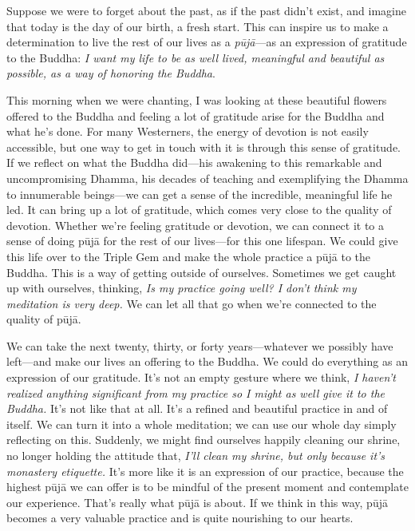 Suppose we were to forget about the past, as if the past didn't exist, 
and imagine that today is the day of our birth, a fresh start. This can 
inspire us to make a determination to live the rest of our lives as a 
\emph{pūjā}---as an expression of gratitude to the Buddha: \emph{I 
want my life to be as well lived, meaningful and beautiful as possible, 
as a way of honoring the Buddha}.

This morning when we were chanting, I was looking at these beautiful 
flowers offered to the Buddha and feeling a lot of gratitude arise for 
the Buddha and what he's done. For many Westerners, the energy of 
devotion is not easily accessible, but one way to get in touch with it 
is through this sense of gratitude. If we reflect on what the Buddha 
did---his awakening to this remarkable and uncompromising Dhamma, his 
decades of teaching and exemplifying the Dhamma to innumerable 
beings---we can get a sense of the incredible, meaningful life he led. 
It can bring up a lot of gratitude, which comes very close to the 
quality of devotion. Whether we're feeling gratitude or devotion, we 
can connect it to a sense of doing pūjā for the rest of our 
lives---for this one lifespan. We could give this life over to the 
Triple Gem and make the whole practice a pūjā to the Buddha. This is 
a way of getting outside of ourselves. Sometimes we get caught up with 
ourselves, thinking, \emph{Is my practice going well? I don't think my 
meditation is very deep.} We can let all that go when we're connected 
to the quality of pūjā.

We can take the next twenty, thirty, or forty years---whatever we 
possibly have left---and make our lives an offering to the Buddha. We 
could do everything as an expression of our gratitude. It's not an 
empty gesture where we think, \emph{I haven't realized anything 
significant from my practice so I might as well give it to the Buddha.} 
It's not like that at all. It's a refined and beautiful practice in and 
of itself. We can turn it into a whole meditation; we can use our whole 
day simply reflecting on this. Suddenly, we might find ourselves 
happily cleaning our shrine, no longer holding the attitude that, 
\emph{I'll clean my shrine, but only because it's monastery etiquette.} 
It's more like it is an expression of our practice, because the highest 
pūjā we can offer is to be mindful of the present moment and 
contemplate our experience. That's really what pūjā is about. If we 
think in this way, pūjā becomes a very valuable practice and is quite 
nourishing to our hearts.

